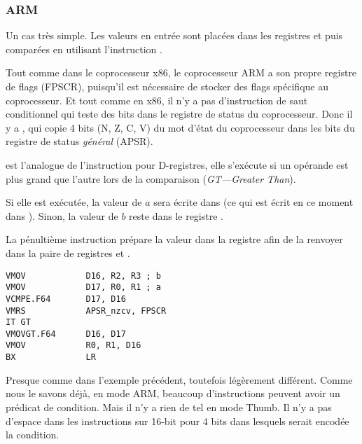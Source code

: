 \subsubsection{ARM}

\myparagraph{\OptimizingXcodeIV (\ARMMode)}



Un cas très simple.
Les valeurs en entrée sont placées dans les registres  et  puis
comparées en utilisant l'instruction .

Tout comme dans le coprocesseur x86, le coprocesseur ARM a son propre registre de
flags (\ac{FPSCR}), puisqu'il est nécessaire de stocker des flags spécifique au coprocesseur.
Et tout comme en x86, il n'y a pas d'instruction de saut conditionnel qui teste des
bits dans le registre de status du coprocesseur.
Donc il y a , qui copie 4 bits (N, Z, C, V) du mot d'état du coprocesseur
dans les bits du registre de status \emph{général} (\ac{APSR}).

 est l'analogue de l'instruction  pour D-registres, elle s'exécute
si un opérande est plus grand que l'autre lors de la comparaison (\emph{GT---Greater Than}).

Si elle est exécutée, la valeur de $a$ sera écrite dans  (ce qui est écrit
en ce moment dans ).
Sinon, la valeur de $b$ reste dans le registre .


La pénultième instruction  prépare la valeur dans la registre 
afin de la renvoyer dans la paire de registres  et .

\myparagraph{\OptimizingXcodeIV (\ThumbTwoMode)}

\begin{lstlisting}[caption=\OptimizingXcodeIV (\ThumbTwoMode),style=customasmARM]
VMOV            D16, R2, R3 ; b
VMOV            D17, R0, R1 ; a
VCMPE.F64       D17, D16
VMRS            APSR_nzcv, FPSCR
IT GT 
VMOVGT.F64      D16, D17
VMOV            R0, R1, D16
BX              LR
\end{lstlisting}

Presque comme dans l'exemple précédent, toutefois légèrement différent.
Comme nous le savons déjà, en mode ARM, beaucoup d'instructions peuvent avoir un
prédicat de condition.
Mais il n'y a rien de tel en mode Thumb.
Il n'y a pas d'espace dans les instructions sur 16-bit pour 4 bits dans lesquels
serait encodée la condition.

